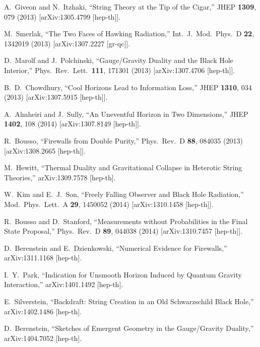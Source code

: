 \documentclass[12pt]{article}
\begin{document}
\begin{thebibliography}{99}
  A.~Giveon and N.~Itzhaki,
  ``String Theory at the Tip of the Cigar,''
  JHEP {\bf 1309}, 079 (2013)
  [arXiv:1305.4799 [hep-th]].

  M.~Smerlak,
  ``The Two Faces of Hawking Radiation,''
  Int.\ J.\ Mod.\ Phys.\ D {\bf 22}, 1342019 (2013)
  [arXiv:1307.2227 [gr-qc]].

  D.~Marolf and J.~Polchinski,
  ``Gauge/Gravity Duality and the Black Hole Interior,''
  Phys.\ Rev.\ Lett.\  {\bf 111}, 171301 (2013)
  [arXiv:1307.4706 [hep-th]].
  
  B.~D.~Chowdhury,
  ``Cool Horizons Lead to Information Loss,''
  JHEP {\bf 1310}, 034 (2013)
  [arXiv:1307.5915 [hep-th]].
  
  A.~Almheiri and J.~Sully,
  ``An Uneventful Horizon in Two Dimensions,''
  JHEP {\bf 1402}, 108 (2014)
  [arXiv:1307.8149 [hep-th]].  

  R.~Bousso,
  ``Firewalls from Double Purity,''
  Phys.\ Rev.\ D {\bf 88}, 084035 (2013)
  [arXiv:1308.2665 [hep-th]].  

  M.~Hewitt,
  ``Thermal Duality and Gravitational Collapse in Heterotic String Theories,''
  arXiv:1309.7578 [hep-th].  

  W.~Kim and E.~J.~Son,
  ``Freely Falling Observer and Black Hole Radiation,''
  Mod.\ Phys.\ Lett.\ A {\bf 29}, 1450052 (2014)
  [arXiv:1310.1458 [hep-th]].

  R.~Bousso and D.~Stanford,
  ``Measurements without Probabilities in the Final State Proposal,''
  Phys.\ Rev.\ D {\bf 89}, 044038 (2014)
  [arXiv:1310.7457 [hep-th]].

  D.~Berenstein and E.~Dzienkowski,
  ``Numerical Evidence for Firewalls,''
  arXiv:1311.1168 [hep-th].

  I.~Y.~Park,
  ``Indication for Unsmooth Horizon Induced by Quantum Gravity Interaction,''
  arXiv:1401.1492 [hep-th].

  E.~Silverstein,
  ``Backdraft: String Creation in an Old Schwarzschild Black Hole,''
  arXiv:1402.1486 [hep-th].

  D.~Berenstein,
  ``Sketches of Emergent Geometry in the Gauge/Gravity Duality,''
  arXiv:1404.7052 [hep-th].


\end{thebibliography}
\end{document}
